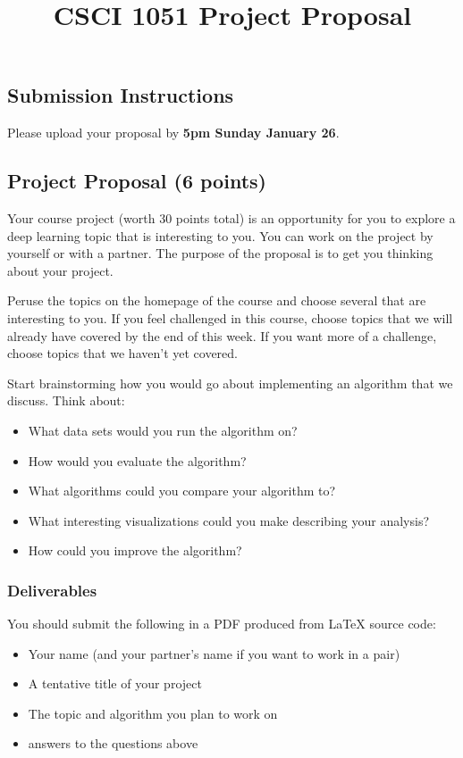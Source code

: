\documentclass{article}
\title{CSCI 1051 Project Proposal}
\author{} %
\date{}
\begin{document}
\maketitle

\subsection*{Submission Instructions}
Please upload your proposal by \textbf{5pm Sunday January 26}.

\subsection*{Project Proposal (6 points)}

Your course project (worth 30 points total) is an opportunity
for you to explore a deep learning topic that is
interesting to you.
You can work on the project by yourself or with a partner.
The purpose of the proposal is to get you thinking 
about your project.

Peruse the topics on the homepage of the course and choose several that are interesting to you.
If you feel challenged in this course, choose topics that we will already have covered by the end of this week.
If you want more of a challenge, choose topics that we haven't yet covered.

Start brainstorming how you would go about implementing an algorithm that we discuss.
Think about:
\begin{itemize}
    \item What data sets would you run the algorithm on?
    \item How would you evaluate the algorithm?
    \item What algorithms could you compare your algorithm to?
    \item What interesting visualizations could you make describing your analysis?
    \item How could you improve the algorithm?
\end{itemize}

\subsubsection*{Deliverables}

You should submit the following in a PDF produced from
LaTeX source code:
\begin{itemize}
    \item Your name (and your partner's name if you want to work in a pair)
    \item A tentative title of your project
    \item The topic and algorithm you plan to work on
    \item answers to the questions above 
\end{itemize}
\end{document}
